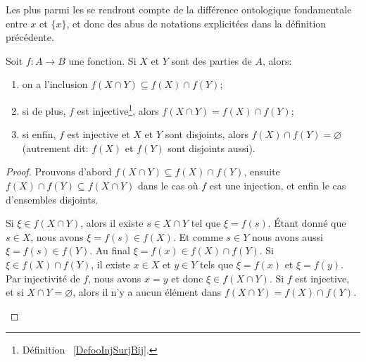 \begin{remark}	\label{REMooDifferenceElementSingleton}
	Les plus  parmi les  se rendront compte de la différence ontologique fondamentale entre \( x\) et \( \{ x \}\), et donc des abus de notations explicitées dans la définition précédente.
\end{remark}

\begin{proposition}		\label{PROPooBXVSooZXmwKC}
	Soit \(f \colon A\to B  \) une fonction. Si \( X\) et \( Y\) sont des parties de \( A\), alors:
	\begin{enumerate}
		\item \label{ITEMooFctInclusionInter}
		      on a l'inclusion \( f(X\cap Y) \subseteq f(X)\cap f(Y)\);
		\item \label{ITEMooFctInjEgaliteInter}
		      si de plus, \( f \) est  injective\footnote{Définition~ \ref{DefooInjSurjBij}.}, alors \( f(X\cap Y)=f(X)\cap f(Y)\);
		\item \label{ITEMooFctInjDisjonction}
		      si enfin, \( f \) est injective et \( X\) et \( Y\) sont disjoints, alors \( f(X)\cap f(Y) = \varnothing \) (autrement dit:  \( f(X) \) et \( f(Y) \) sont disjoints aussi).
	\end{enumerate}
\end{proposition}

\begin{proof}
	Prouvons d'abord \( f(X\cap Y) \subseteq f(X)\cap f(Y)\), ensuite \( f(X)\cap f(Y)\subseteq f(X\cap Y)\) dans le cas où \( f \) est une injection, et enfin le cas d'ensembles disjoints.
	\begin{subproof}
		Si \( \xi\in f(X\cap Y)\), alors il existe \( s\in X\cap Y\) tel que \( \xi=f(s)\). Étant donné que \( s\in X\), nous avons \( \xi=f(s)\in f(X)\). Et comme \( s\in Y\) nous avons aussi \( \xi=f(s)\in f(Y)\). Au final \( \xi=f(x)\in f(X)\cap f(Y)\).
		Si \( \xi\in f(X)\cap f(Y)\), il existe \( x\in X\) et \( y\in Y\) tels que \( \xi=f(x)\) et \( \xi=f(y)\). Par injectivité de \( f\), nous avons \( x=y\) et donc \( \xi\in f(X\cap Y)\).
		Si \( f \) est injective, et si \( X\cap Y = \varnothing \), alors il n'y a aucun élément dans \( f(X\cap Y)=f(X)\cap f(Y) \).
	\end{subproof}
\end{proof}

